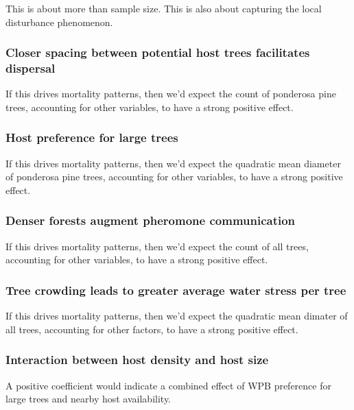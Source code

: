 \documentclass[]{article}
\begin{document}
This is about more than sample size. This is also about capturing the
local disturbance phenomenon.

\subsubsection{Closer spacing between potential host trees facilitates
dispersal}\label{closer-spacing-between-potential-host-trees-facilitates-dispersal}

If this drives mortality patterns, then we'd expect the count of
ponderosa pine trees, accounting for other variables, to have a strong
positive effect.

\subsubsection{Host preference for large
trees}\label{host-preference-for-large-trees}

If this drives mortality patterns, then we'd expect the quadratic mean
diameter of ponderosa pine trees, accounting for other variables, to
have a strong positive effect.

\subsubsection{Denser forests augment pheromone
communication}\label{denser-forests-augment-pheromone-communication}

If this drives mortality patterns, then we'd expect the count of all
trees, accounting for other variables, to have a strong positive effect.

\subsubsection{Tree crowding leads to greater average water stress per
tree}\label{tree-crowding-leads-to-greater-average-water-stress-per-tree}

If this drives mortality patterns, then we'd expect the quadratic mean
dimater of all trees, accounting for other factors, to have a strong
positive effect.

\subsubsection{Interaction between host density and host
size}\label{interaction-between-host-density-and-host-size}

A positive coefficient would indicate a combined effect of WPB
preference for large trees and nearby host availability.
\end{document}

